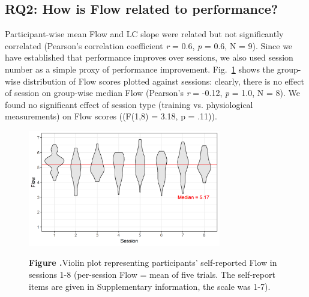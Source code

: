 \documentclass{frontierstyle/frontiersSCNS}
\newcommand{\hl}{\textcolor{red!80}}
\newcommand{\nicewidth}{0.75\textwidth}
\begin{document}
\subsection{RQ2: How is Flow related to performance?}

Participant-wise mean Flow and LC slope were related but not significantly correlated (Pearson's correlation coefficient {\it r} = 0.6, {\it p} = 0.6, N = 9). %
Since we have established that performance improves over sessions, we also used session number as a simple proxy of performance improvement. Fig.~\ref{fig:FlowVssn} shows the group-wise distribution of Flow scores plotted against sessions: clearly, there is no effect of session on group-wise median Flow (Pearson's {\it r} = -0.12, {\it p} = 1.0, N = 8). \hl{We found no significant effect of session type (training vs. physiological measurements) on Flow scores ((F(1,8) = 3.18, p = .11)).} %

\begin{figure}[!b]
\begin{center}
	\includegraphics[width=\nicewidth]{4_session_fss2}
\end{center}
	\textbf{\label{fig:FlowVssn} Figure .}{Violin plot representing participants' self-reported Flow in sessions 1-8 (per-session Flow = mean of five trials. The self-report items are given in Supplementary information, the scale was 1-7).}
\end{figure}
\end{document}
